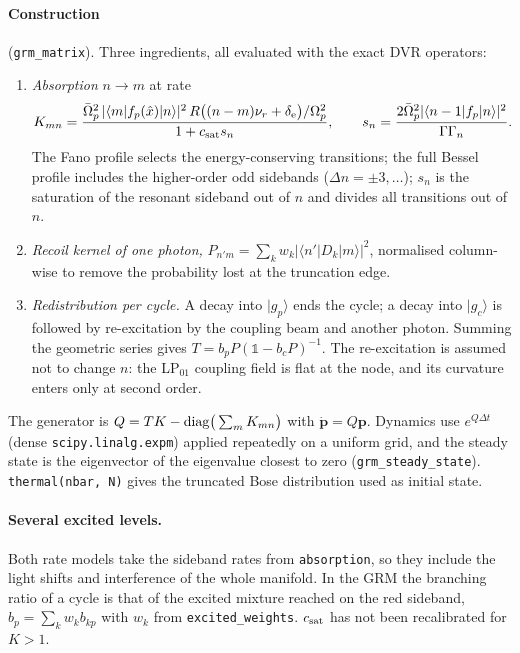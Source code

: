 \documentclass[11pt,a4paper]{article}
\newcommand{\ket}[1]{|#1\rangle}
\newcommand{\bra}[1]{\langle #1|}
\newcommand{\gp}{\ket{g_p}}
\newcommand{\gc}{\ket{g_c}}
\newcommand{\Om}{\Omega}
\newcommand{\code}[1]{\texttt{#1}}
\begin{document}
\paragraph{Construction} (\code{grm\_matrix}). Three ingredients, all evaluated with the exact DVR operators:
\begin{enumerate}
\item \emph{Absorption} $n\to m$ at rate
\begin{equation}
  K_{mn}=\frac{\bar\Om_p^2\,|\bra mf_p(\hat x)\ket n|^2\,R\big((n-m)\nu_r+\delta_{\rm e}\big)/\Om_p^2}{1+c_{\rm sat}s_n},\qquad
  s_n=\frac{2\bar\Om_p^2|\bra{n-1}f_p\ket n|^2}{\Gamma\Gamma_n}.
\end{equation}
The Fano profile selects the energy-conserving transitions; the full Bessel profile includes the higher-order odd sidebands ($\Delta n=\pm3,\dots$); $s_n$ is the saturation of the resonant sideband out of $n$ and divides all transitions out of $n$.
\item \emph{Recoil kernel of one photon,} $P_{n'm}=\sum_kw_k|\bra{n'}D_k\ket m|^2$, normalised column-wise to remove the probability lost at the truncation edge.
\item \emph{Redistribution per cycle.} A decay into $\gp$ ends the cycle; a decay into $\gc$ is followed by re-excitation by the coupling beam and another photon. Summing the geometric series gives $T=b_pP(\mathbb1-b_cP)^{-1}$. The re-excitation is assumed not to change $n$: the LP$_{01}$ coupling field is flat at the node, and its curvature enters only at second order.
\end{enumerate}
The generator is $Q=TK-{\rm diag}\big(\sum_mK_{mn}\big)$ with $\dot{\bm p}=Q\bm p$. Dynamics use $e^{Q\Delta t}$ (dense \code{scipy.linalg.expm}) applied repeatedly on a uniform grid, and the steady state is the eigenvector of the eigenvalue closest to zero (\code{grm\_steady\_state}). \code{thermal(nbar, N)} gives the truncated Bose distribution used as initial state.

\paragraph{Several excited levels.} Both rate models take the sideband rates from \code{absorption}, so they include the light shifts and interference of the whole manifold. In the GRM the branching ratio of a cycle is that of the excited mixture reached on the red sideband, $b_p=\sum_kw_kb_{kp}$ with $w_k$ from \code{excited\_weights}. $c_{\rm sat}$ has not been recalibrated for $K>1$.
\end{document}
